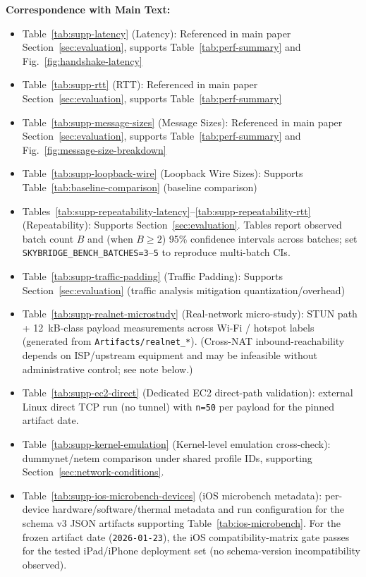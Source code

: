 \documentclass[10pt,journal,compsoc]{IEEEtran}
\begin{document}
\textbf{Correspondence with Main Text:}
\begin{itemize}
\raggedright
\item Table~\ref{tab:supp-latency} (Latency): Referenced in main paper Section~\ref{sec:evaluation}, supports Table~\ref{tab:perf-summary} and Fig.~\ref{fig:handshake-latency}
\item Table~\ref{tab:supp-rtt} (RTT): Referenced in main paper Section~\ref{sec:evaluation}, supports Table~\ref{tab:perf-summary}
\item Table~\ref{tab:supp-message-sizes} (Message Sizes): Referenced in main paper Section~\ref{sec:evaluation}, supports Table~\ref{tab:perf-summary} and Fig.~\ref{fig:message-size-breakdown}
\item Table~\ref{tab:supp-loopback-wire} (Loopback Wire Sizes): Supports Table~\ref{tab:baseline-comparison} (baseline comparison)
\item Tables~\ref{tab:supp-repeatability-latency}--\ref{tab:supp-repeatability-rtt} (Repeatability): Supports Section~\ref{sec:evaluation}. Tables report observed batch count $B$ and (when $B \ge 2$) 95\% confidence intervals across batches; set \texttt{SKYBRIDGE\_BENCH\_BATCHES=3}--\texttt{5} to reproduce multi-batch CIs.
\item Table~\ref{tab:supp-traffic-padding} (Traffic Padding): Supports Section~\ref{sec:evaluation} (traffic analysis mitigation quantization/overhead)
\item Table~\ref{tab:supp-realnet-microstudy} (Real-network micro-study): STUN path + 12~kB-class payload measurements across Wi-Fi / hotspot labels (generated from \texttt{Artifacts/realnet\_*}). (Cross-NAT inbound-reachability depends on ISP/upstream equipment and may be infeasible without administrative control; see note below.)
\item Table~\ref{tab:supp-ec2-direct} (Dedicated EC2 direct-path validation): external Linux direct TCP run (no tunnel) with \texttt{n=50} per payload for the pinned artifact date.
\item Table~\ref{tab:supp-kernel-emulation} (Kernel-level emulation cross-check): dummynet/netem comparison under shared profile IDs, supporting Section~\ref{sec:network-conditions}.
\item Table~\ref{tab:supp-ios-microbench-devices} (iOS microbench metadata): per-device hardware/software/thermal metadata and run configuration for the schema v3 JSON artifacts supporting Table~\ref{tab:ios-microbench}. For the frozen artifact date (\texttt{2026-01-23}), the iOS compatibility-matrix gate passes for the tested iPad/iPhone deployment set (no schema-version incompatibility observed).

\end{itemize}
\end{document}
